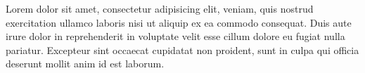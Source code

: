 \documentclass{article}
\begin{document}
Lorem  dolor sit amet, consectetur adipisicing elit, 
veniam, quis nostrud exercitation ullamco laboris nisi ut aliquip ex ea
commodo consequat. Duis aute irure dolor in reprehenderit in voluptate
velit esse cillum dolore eu fugiat nulla pariatur. Excepteur sint
occaecat cupidatat non proident, sunt in culpa qui officia deserunt
mollit anim id est laborum.
\end{document}
